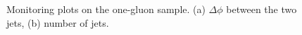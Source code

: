  \begin{figure}[htb]
 \centering
{}

  \caption{Monitoring plots on the one-gluon sample. 
  (a) $\Delta\phi$ between the two jets,
  (b) number of jets.
  }
 \label{fig:GGmonitoring2}
\end{figure}


